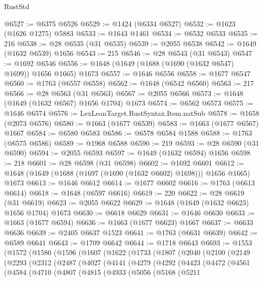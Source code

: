 \begin{lexlean}{RustStd}
\begin{coremodule}
{\begin{coremodule}
{{{{{{{{{{{{{{{{{{{{{{{{{{{{{{{{{{{{{{{{{{{{@6527 := @6375 @6526
@6529 := @1424 (@6334 @6527)
@6532 := @1623 (@1626 @1275) @5883
@6533 := @1643 @1461
@6534 := @6532 @6533
@6535 := 216
@6538 := @28 @6535 (@31 @6535)
@6539 := @2055 @6538
@6542 := @1649 (@1632 @6539) @1656
@6543 := 215
@6546 := @28 @6543 (@31 @6543)
@6547 := @1692 @6546
@6556 := @1648 (@1649 (@1688 (@1690 (@1632 @6547) @1699)) @1656 @1665) @1673
@6557 := @1646 @6556
@6558 := @1677 @6547
@6560 := @1763 (@6557 @6558)
@6562 := @1648 (@6542 @6560)
@6563 := 217
@6566 := @28 @6563 (@31 @6563)
@6567 := @2055 @6566
@6573 := @1648 (@1649 (@1632 @6567) @1656 @1704) @1673
@6574 := @6562 @6573
@6575 := @1646 @6574
@6576 := LexLeanTarget.RustSyntax.Item.natSub
@6578 := @1658 (@2073 @6576)
@6580 := @1663 (@1677 @6539)
@6583 := @1663 (@1677 @6567) @1667
@6584 := @6580 @6583
@6586 := @6578 @6584 @1588
@6588 := @1763 (@6575 @6586)
@6589 := @1968 @6588
@6590 := 219
@6593 := @28 @6590 (@31 @6590)
@6594 := @2055 @6593
@6597 := @1649 (@1632 @6594) @1656
@6598 := 218
@6601 := @28 @6598 (@31 @6598)
@6602 := @1692 @6601
@6612 := @1648 (@1649 (@1688 (@1697 (@1690 (@1632 @6602) @1698))) @1656 @1665) @1673
@6613 := @1646 @6612
@6614 := @1677 @6602
@6616 := @1763 (@6613 @6614)
@6618 := @1648 (@6597 @6616)
@6619 := 220
@6622 := @28 @6619 (@31 @6619)
@6623 := @2055 @6622
@6629 := @1648 (@1649 (@1632 @6623) @1656 @1704) @1673
@6630 := @6618 @6629
@6631 := @1646 @6630
@6633 := @1663 (@1677 @6594)
@6636 := @1663 (@1677 @6623) @1667
@6637 := @6633 @6636
@6639 := @2405 @6637 @1523
@6641 := @1763 (@6631 @6639)
@6642 := @6589 @6641
@6643 := @1709 @6642
@6644 := @1718 @6643
@6693 := @1553
    (@1572
      (@1580
        (@1596
          (@1607
            (@1622
              (@1733
                (@1807
                  (@2040
                    (@2100
                      (@2149
                        (@2293
                          (@2312
                            (@2487
                              (@4027
                                (@4141
                                  (@4279
                                    (@4292
                                      (@4423
                                        (@4472
                                          (@4561
                                            (@4584
                                              (@4710
                                                (@4807
                                                  (@4815
                                                    (@4933
                                                      (@5056
                                                        (@5168
                                                          (@5211
}}}}}}}}}}}}}}}}}}}}}}}}}}}}}}}}}}}}}}}}}}}}
\end{coremodule}}
\end{coremodule}
\end{lexlean}
